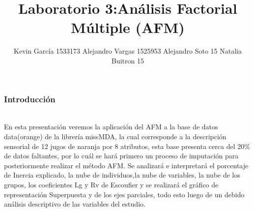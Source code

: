 \documentclass[12pt]{beamer}
\author[Kevin - Alejandro x2 - Natalia ]{Kevin García 1533173 \newline Alejandro Vargas 1525953 \newline Alejandro Soto 15 \newline Natalia Buitron 15}
\title[Análisis Factorial Múltiple (AFM)]{Laboratorio 3:Análisis Factorial Múltiple (AFM)}
\begin{document}
\justify
\begin{frame}
\titlepage
\end{frame}

\begin{frame}
\frametitle{Introducción}
~\\En esta presentación veremos la aplicación del AFM a la base de datos data(orange) de la librería missMDA, la cual corresponde a la descripción sensorial de 12 jugos de naranja por 8 atributos, esta base presenta cerca del 20\% de datos faltantes, por lo cuál se hará primero un proceso de imputación para posteriormente realizar el método AFM. Se analizará e interpretará el porcentaje de Inercia explicado, la nube de individuos,la nube de variables, la nube de los grupos, los coeficientes Lg y Rv de Escoufier y se realizará el gráfico de representación Superpuesta y de los ejes parciales, todo esto luego de un debido análisis descriptivo de las variables del estudio.
\end{frame}
\end{document}
